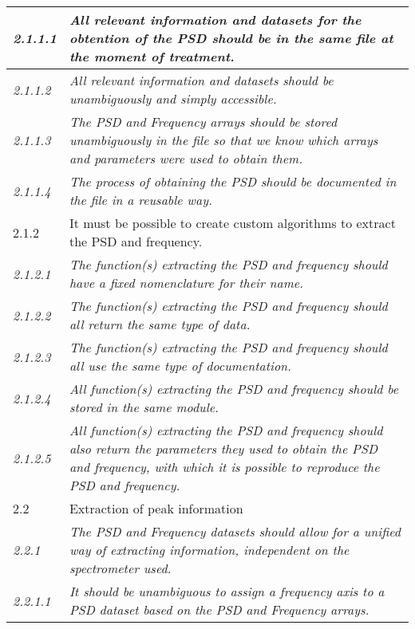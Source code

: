 \begin{tabular}{|p{1cm}|p{14cm}|}
    \hline
    \textit{2.1.1.1} & \textit{All relevant information and datasets for the obtention of the PSD should be in the same file at the moment of treatment.} \\ \hline
    \textit{2.1.1.2} & \textit{All relevant information and datasets should be unambiguously and simply accessible.} \\ \hline
    \textit{2.1.1.3} & \textit{The PSD and Frequency arrays should be stored unambiguously in the file so that we know which arrays and parameters were used to obtain them.} \\ \hline
    \textit{2.1.1.4} & \textit{The process of obtaining the PSD should be documented in the file in a reusable way.} \\ \hline
    \rowcolor{graysuperlight} 2.1.2 &  It must be possible to create custom algorithms to extract the PSD and frequency. \\ \hline
    \textit{2.1.2.1} & \textit{The function(s) extracting the PSD and frequency should have a fixed nomenclature for their name.} \\ \hline
    \textit{2.1.2.2} & \textit{The function(s) extracting the PSD and frequency should all return the same type of data.} \\ \hline
    \textit{2.1.2.3} & \textit{The function(s) extracting the PSD and frequency should all use the same type of documentation.} \\ \hline
    \textit{2.1.2.4} & \textit{All function(s) extracting the PSD and frequency should be stored in the same module.} \\ \hline
    \textit{2.1.2.5} & \textit{All function(s) extracting the PSD and frequency should also return the parameters they used to obtain the PSD and frequency, with which it is possible to reproduce the PSD and frequency.} \\ \hline

    \rowcolor{graylight} 2.2 & Extraction of peak information \\ \hline
    \rowcolor{graysuperlight}\textit{2.2.1} & \textit{The PSD and Frequency datasets should allow for a unified way of extracting information, independent on the spectrometer used.} \\ \hline
    \textit{2.2.1.1} & \textit{It should be unambiguous to assign a frequency axis to a PSD dataset based on the PSD and Frequency arrays.} \\ \hline


\end{tabular}
